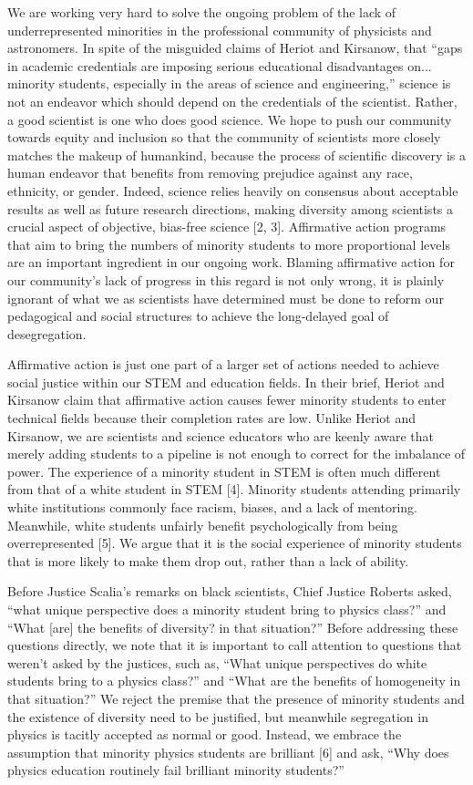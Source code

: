 \documentclass[letterpaper,11pt]{letter}
\begin{document}
We are working very hard to solve the ongoing problem of the lack of underrepresented minorities in the professional community of physicists and astronomers. In spite of the misguided claims of Heriot and Kirsanow, that ``gaps in academic credentials are imposing serious educational disadvantages on... minority students, especially in the areas of science and engineering,'' science is not an endeavor which should depend on the credentials of the scientist. Rather, a good scientist is one who does good science. We hope to push our community towards equity and inclusion so that the community of scientists more closely matches the makeup of humankind, because the process of scientific discovery is a human endeavor that benefits from removing prejudice against any race, ethnicity, or gender. Indeed, science relies heavily on consensus about acceptable results as well as future research directions, making diversity among scientists a crucial aspect of objective, bias-free science [2, 3]. Affirmative action programs that aim to bring the numbers of minority students to more proportional levels are an important ingredient in our ongoing work. Blaming affirmative action for our community's lack of progress in this regard is not only wrong, it is plainly ignorant of what we as scientists have determined must be done to reform our pedagogical and social structures to achieve the long-delayed goal of desegregation.

Affirmative action is just one part of a larger set of actions needed to achieve social justice within our STEM and education fields. In their brief, Heriot and Kirsanow claim that affirmative action causes fewer minority students to enter technical fields because their completion rates are low. Unlike Heriot and Kirsanow, we are scientists and science educators who are keenly aware that merely adding students to a pipeline is not enough to correct for the imbalance of power. The experience of a minority student in STEM is often much different from that of a white student in STEM [4]. Minority students attending primarily white institutions commonly face racism, biases, and a lack of mentoring. Meanwhile, white students unfairly benefit psychologically from being overrepresented [5]. We argue that it is the social experience of minority students that is more likely to make them drop out, rather than a lack of ability.

Before Justice Scalia's remarks on black scientists, Chief Justice Roberts asked, ``what unique perspective does a minority student bring to physics class?'' and ``What [are] the benefits of diversity? in that situation?'' Before addressing these questions directly, we note that it is important to call attention to questions that weren't asked by the justices, such as, ``What unique perspectives do white students bring to a physics class?'' and ``What are the benefits of homogeneity in that situation?'' We reject the premise that the presence of minority students and the existence of diversity need to be justified, but meanwhile segregation in physics is tacitly accepted as normal or good. Instead, we embrace the assumption that minority physics students are brilliant [6] and ask, ``Why does physics education routinely fail brilliant minority students?''
\end{document}
